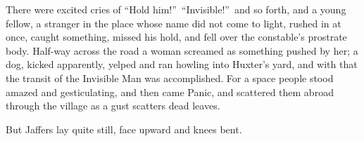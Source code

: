 There were excited cries of “Hold him!”\ “Invisible!”\ and so forth, and a young fellow, a stranger in the place whose name did not come to light, rushed in at once, caught something, missed his hold, and fell over the constable’s prostrate body. Half-way across the road a woman screamed as something pushed by her; a dog, kicked apparently, yelped and ran howling into Huxter’s yard, and with that the transit of the Invisible Man was accomplished. For a space people stood amazed and gesticulating, and then came Panic, and scattered them abroad through the village as a gust scatters dead leaves.

But Jaffers lay quite still, face upward and knees bent.